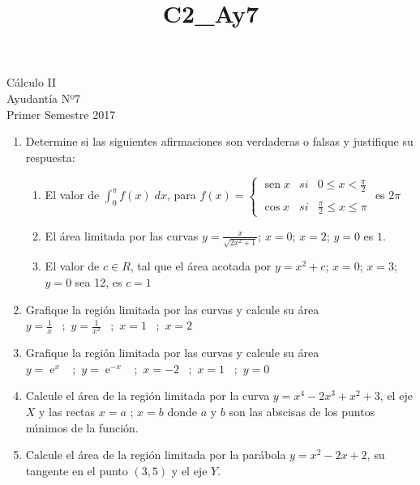 \documentclass[letterpaper,10pt]{article}
\title{C2_Ay7}
\newcommand{\dis}{\displaystyle}
\def\sin{\operatorname{sen}}
\def\e{\operatorname{e}}
\begin{document}
\begin{center}
Cálculo II\\
Ayudantía Nº7\\
Primer Semestre 2017
\end{center}

\begin{enumerate}
\item Determine si las siguientes afirmaciones son verdaderas o falsas y justifique su respuesta:

\begin{enumerate}[label=\emph{\alph*)}]

\item El valor de $\displaystyle \int_0^\pi f(x) \; dx$, para $f(x)= \left\{ \begin{array}{lcc}
             \sin x &   si  & 0 \leq x < \frac{\pi}{2} \\
             \\ \cos x &  si & \frac{\pi}{2} \leq x \leq \pi 
             \end{array}
   \right.$ es $2\pi$\\

\item El área limitada por las curvas $y = \frac{x}{\sqrt{2x^2+1}}$; $x=0$; $x=2$; $y=0$ es $1$.

\item El valor de $c \in R$, tal que el área acotada por $y = x^2+c$; $x=0$; $x=3$; $y=0$ sea 12, es $c=1$ 
\end{enumerate}
\vspace{2mm}
\item Grafique la regi\'{o}n  limitada por las curvas y calcule su \'{a}rea\\
$\dis y=\frac{1}{x}$ \, ;\,  $\dis y=\frac{1}{x^2}$ \, ;\, $x=1$ \, ;\, $x=2$

\item Grafique la regi\'{o}n  limitada por las curvas y calcule su \'{a}rea\\
$\dis y=\e^x$ \, ;\,  $\dis y=\e^{-x}$ \, ;\, $x=-2$ \, ;\, $x=1$ \, ;\,  $\dis y=0$

\item Calcule el \'{a}rea de la regi\'{o}n limitada por la curva
$y=x^4-2x^3+x^2+3$, el eje $X$ y las rectas $x=a$ ; $x=b$ donde  $a$
y $b$ son las abscisas de los puntos m\'{\i}nimos de la funci\'{o}n.


\item Calcule el \'{a}rea de la regi\'{o}n limitada por la par\'{a}bola
$y=x^2-2x+2$, su tangente en el punto $(3,5)$ y el eje $Y$.




\end{enumerate}




\vspace{10mm}
\end{document}
